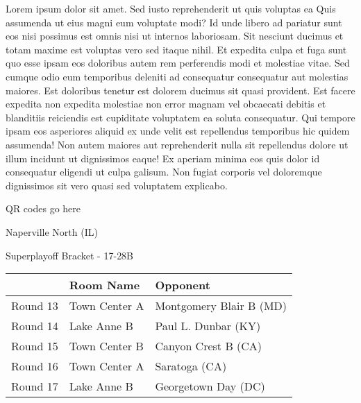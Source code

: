 \documentclass{article}%
\begin{document}
\vspace*{8pt}%
\linebreak%
\newline%
\newline%
Lorem ipsum dolor sit amet. Sed iusto reprehenderit ut quis voluptas ea Quis assumenda ut eius magni eum voluptate modi? Id unde libero ad pariatur sunt eos nisi possimus est omnis nisi ut internos laboriosam. Sit nesciunt ducimus et totam maxime est voluptas vero sed itaque nihil. Et expedita culpa et fuga sunt quo esse ipsam eos doloribus autem rem perferendis modi et molestiae vitae.\newline%
\newline%
Sed cumque odio eum temporibus deleniti ad consequatur consequatur aut molestias maiores. Est doloribus tenetur est dolorem ducimus sit quasi provident. Est facere expedita non expedita molestiae non error magnam vel obcaecati debitis et blanditiis reiciendis est cupiditate voluptatem ea soluta consequatur. Qui tempore ipsam eos asperiores aliquid ex unde velit est repellendus temporibus hic quidem assumenda!\newline%
\newline%
Non autem maiores aut reprehenderit nulla sit repellendus dolore ut illum incidunt ut dignissimos eaque! Ex aperiam minima eos quis dolor id consequatur eligendi ut culpa galisum. Non fugiat corporis vel doloremque dignissimos sit vero quasi sed voluptatem explicabo.\newline%
\newline%
%
\vspace*{30pt}%
\begin{center}%
\begin{Huge}%
QR codes go here%
\end{Huge}%
\end{center}%
\newpage%
\begin{center}%
\begin{Huge}%
Naperville North (IL)%
\end{Huge}%
\vspace*{8pt}%
\linebreak%
\begin{Large}%
Superplayoff Bracket {-} 17{-}28B%
\end{Large}%
\end{center}%
%
\begin{tabularx}{\textwidth}{|c|Y|Y|}%
\hline%
&Room Name&Opponent\\%
\hline%
Round 13&Town Center A&Montgomery Blair B (MD)\\%
Round 14&Lake Anne B&Paul L. Dunbar (KY)\\%
Round 15&Town Center B&Canyon Crest B (CA)\\%
Round 16&Town Center A&Saratoga (CA)\\%
Round 17&Lake Anne B&Georgetown Day (DC)\\%
\hline%
\end{tabularx}%
\end{document}
